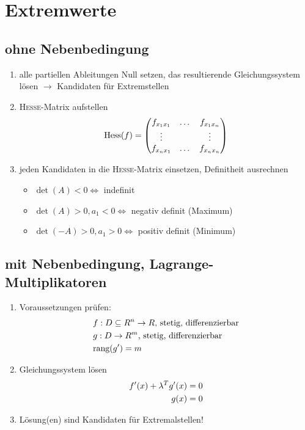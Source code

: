 \documentclass[ngerman,a4paper]{article}
\begin{document}
\section{Extremwerte}
\subsection{ohne Nebenbedingung}
\begin{enumerate}[label=\textbf{\arabic*.}]
	\item alle partiellen Ableitungen Null setzen, das resultierende Gleichungssystem lösen $\to$ Kandidaten für Extremstellen
	\item \textsc{Hesse}-Matrix aufstellen
	\begin{align}
		\text{Hess}(f)=\begin{pmatrix}f_{x_1x_1} & \dots & f_{x_1x_n} \\ \vdots & & \vdots \\ f_{x_nx_1} & \dots & f_{x_nx_n}\end{pmatrix}\notag
	\end{align}
	\item jeden Kandidaten in die \textsc{Hesse}-Matrix einsetzen, Definitheit ausrechnen
	\begin{itemize}
		\item $\det(A)<0\Leftrightarrow$ indefinit
		\item $\det(A)>0, a_1<0\Leftrightarrow$ negativ definit (Maximum)
		\item $\det(-A)>0, a_1>0\Leftrightarrow$ positiv definit (Minimum)
	\end{itemize}
\end{enumerate}

\subsection{mit Nebenbedingung, Lagrange-Multiplikatoren}
	\begin{enumerate}[label=\textbf{\arabic*.}]
		\item Voraussetzungen prüfen: 
		\begin{align}
			& f:D\subseteq R^n\to R\text{, stetig, differenzierbar} \notag \\
			& g: D\to R^m\text{, stetig, differenzierbar}\notag \\
			&\text{rang}(g')=m \notag
		\end{align}
		\item Gleichungssystem lösen
		\begin{align}
			f'(x) + \lambda^Tg'(x)&=0\notag \\
			g(x) &= 0\notag 
		\end{align}
		\item Lösung(en) sind Kandidaten für Extremalstellen!
	\end{enumerate}
\end{document}
